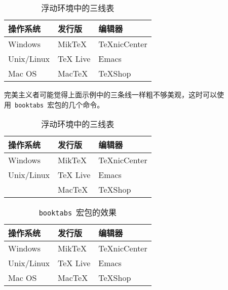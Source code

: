 \begin{table}[htbp]
\caption{浮动环境中的三线表}
\label{tab:threesome}
\centering
\begin{tabular}{lll}
    \hline 
    操作系统 & 发行版 & 编辑器 \\
    \hline 
    Windows & MikTeX & TeXnicCenter \\
    Unix/Linux & TeX Live & Emacs \\
    Mac OS & MacTeX & TeXShop \\
    \hline 
\end{tabular}
\end{table}

完美主义者可能觉得上面示例中的三条线一样粗不够美观，这时可以使用~\verb|booktabs|~宏包\citep{Fear_2005}的几个命令。

\begin{code}
\begin{table}[htbp]
\caption{浮动环境中的三线表}
\centering
\begin{tabular}{lll}
    \toprule
    操作系统 & 发行版 & 编辑器 \\
    \midrule
    Windows & MikTeX & TeXnicCenter \\
    Unix/Linux & TeX Live & Emacs \\
\end{code}

\begin{code}
    Mac OS & MacTeX & TeXShop \\
    \bottomrule
\end{tabular}
\end{table}
\end{code}

\begin{table}[htbp]
\caption{\texttt{booktabs}~宏包的效果}
\centering
\begin{tabular}{lll}
    \toprule
    操作系统 & 发行版 & 编辑器 \\
    \midrule
    Windows & MikTeX & TeXnicCenter \\
    Unix/Linux & TeX Live & Emacs \\
    Mac OS & MacTeX & TeXShop \\
    \bottomrule
\end{tabular}
\end{table}

